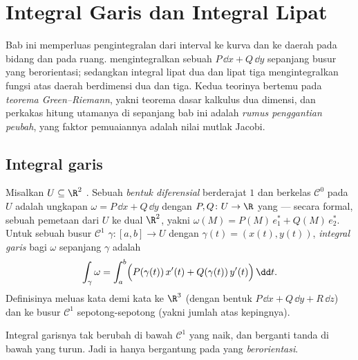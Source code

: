 \chapter{Integral Garis dan Integral Lipat}\label{ch:b2:multint}

Bab ini memperluas pengintegralan dari interval ke kurva dan ke
daerah pada bidang dan pada ruang.  mengintegralkan sebuah
\emph{} $P\,\dd x + Q\,\dd y$ sepanjang busur
yang berorientasi; sedangkan integral lipat dua dan lipat tiga mengintegralkan fungsi atas
daerah berdimensi dua dan tiga. Kedua teorinya bertemu pada
\emph{teorema Green--Riemann}, yakni teorema dasar kalkulus
dua dimensi, dan perkakas hitung utamanya di sepanjang bab ini adalah
\emph{rumus penggantian peubah}, yang faktor pemuaiannya adalah
nilai mutlak  Jacobi.

\section{Integral garis}

\begin{definition}\label{def:b2:multint:lineint}
Misalkan $U \subseteq \R^2$ . Sebuah \emph{bentuk
diferensial} berderajat
$1$ dan berkelas $\mathcal{C}^0$ pada $U$ adalah ungkapan
$\omega = P\,\dd x + Q\,\dd y$ dengan $P, Q \colon U \to \R$
yang  --- secara formal, sebuah pemetaan  dari $U$ ke dual
$\R^2$, yakni $\omega(M) = P(M)\,e_1^* + Q(M)\,e_2^*$. Untuk sebuah
busur $\mathcal{C}^1$ $\gamma \colon [a, b] \to U$ dengan $\gamma(t) =
(x(t), y(t))$, \emph{integral garis} bagi
$\omega$ sepanjang $\gamma$
adalah
\[
\int_\gamma \omega
= \int_a^b \Bigl(P(\gamma(t))\,x'(t)
+ Q(\gamma(t))\,y'(t)\Bigr)\,\dd t .
\]
Definisinya meluas kata demi kata ke $\R^3$ (dengan bentuk $P\,\dd x +
Q\,\dd y + R\,\dd z$) dan ke busur $\mathcal{C}^1$ sepotong-sepotong (yakni jumlah
atas kepingnya).
\end{definition}

\begin{proposition}\label{prop:b2:multint:lineinv}
Integral garisnya tak berubah di bawah 
$\mathcal{C}^1$ yang naik, dan berganti tanda di bawah yang turun. Jadi
ia hanya bergantung pada  yang \emph{berorientasi}.
\end{proposition}

